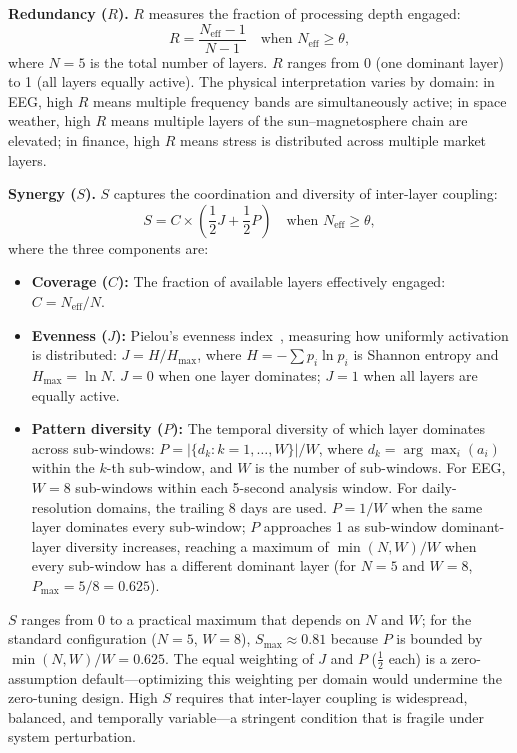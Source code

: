 \documentclass[aip,cha,reprint,amsmath,amssymb,final]{revtex4-2}
\begin{document}
\textbf{Redundancy ($R$).} $R$ measures the fraction of processing depth engaged:
\begin{equation}
R = \frac{N_{\text{eff}} - 1}{N - 1} \quad \text{when } N_{\text{eff}} \geq \theta,
\end{equation}
where $N = 5$ is the total number of layers. $R$ ranges from 0 (one dominant layer) to 1 (all layers equally active). The physical interpretation varies by domain: in EEG, high $R$ means multiple frequency bands are simultaneously active; in space weather, high $R$ means multiple layers of the sun--magnetosphere chain are elevated; in finance, high $R$ means stress is distributed across multiple market layers.

\textbf{Synergy ($S$).} $S$ captures the coordination and diversity of inter-layer coupling:
\begin{equation}
S = C \times \left(\frac{1}{2} J + \frac{1}{2} P\right) \quad \text{when } N_{\text{eff}} \geq \theta,
\end{equation}
where the three components are:

\begin{itemize}
\item \textbf{Coverage ($C$):} The fraction of available layers effectively engaged: $C = N_{\text{eff}} / N$.

\item \textbf{Evenness ($J$):} Pielou's evenness index~\cite{pielou1966}, measuring how uniformly activation is distributed: $J = H / H_{\max}$, where $H = -\sum p_i \ln p_i$ is Shannon entropy and $H_{\max} = \ln N$. $J = 0$ when one layer dominates; $J = 1$ when all layers are equally active.

\item \textbf{Pattern diversity ($P$):} The temporal diversity of which layer dominates across sub-windows: $P = |\{d_k : k = 1, \ldots, W\}| / W$, where $d_k = \arg\max_i(a_i)$ within the $k$-th sub-window, and $W$ is the number of sub-windows. For EEG, $W = 8$ sub-windows within each 5-second analysis window. For daily-resolution domains, the trailing 8 days are used. $P = 1/W$ when the same layer dominates every sub-window; $P$ approaches 1 as sub-window dominant-layer diversity increases, reaching a maximum of $\min(N, W)/W$ when every sub-window has a different dominant layer (for $N = 5$ and $W = 8$, $P_{\max} = 5/8 = 0.625$).
\end{itemize}

$S$ ranges from 0 to a practical maximum that depends on $N$ and $W$; for the standard configuration ($N = 5$, $W = 8$), $S_{\max} \approx 0.81$ because $P$ is bounded by $\min(N, W)/W = 0.625$. The equal weighting of $J$ and $P$ ($\frac{1}{2}$ each) is a zero-assumption default---optimizing this weighting per domain would undermine the zero-tuning design. High $S$ requires that inter-layer coupling is widespread, balanced, and temporally variable---a stringent condition that is fragile under system perturbation.
\end{document}
